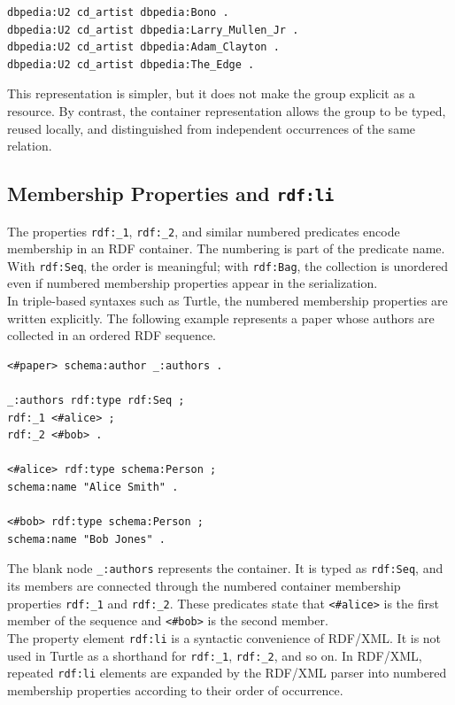\documentclass{scrbook}
\begin{document}
	\begin{lstlisting}
dbpedia:U2 cd_artist dbpedia:Bono .
dbpedia:U2 cd_artist dbpedia:Larry_Mullen_Jr .
dbpedia:U2 cd_artist dbpedia:Adam_Clayton .
dbpedia:U2 cd_artist dbpedia:The_Edge .
	\end{lstlisting}
	
	This representation is simpler, but it does not make the group explicit as a resource. By contrast, the container representation allows the group to be typed, reused locally, and distinguished from independent occurrences of the same relation.
	
	\subsection{Membership Properties and \texttt{rdf:li}}
	
	The properties \texttt{rdf:\_1}, \texttt{rdf:\_2}, and similar numbered predicates encode membership in an RDF container. The numbering is part of the predicate name. With \texttt{rdf:Seq}, the order is meaningful; with \texttt{rdf:Bag}, the collection is unordered even if numbered membership properties appear in the serialization.\\
	
	In triple-based syntaxes such as Turtle, the numbered membership properties are written explicitly. The following example represents a paper whose authors are collected in an ordered RDF sequence.
	
	\begin{lstlisting}
<#paper> schema:author _:authors .

_:authors rdf:type rdf:Seq ;
rdf:_1 <#alice> ;
rdf:_2 <#bob> .

<#alice> rdf:type schema:Person ;
schema:name "Alice Smith" .

<#bob> rdf:type schema:Person ;
schema:name "Bob Jones" .
	\end{lstlisting}
	
	The blank node \texttt{\_:authors} represents the container. It is typed as \texttt{rdf:Seq}, and its members are connected through the numbered container membership properties \texttt{rdf:\_1} and \texttt{rdf:\_2}. These predicates state that \texttt{<\#alice>} is the first member of the sequence and \texttt{<\#bob>} is the second member.\\
	
	The property element \texttt{rdf:li} is a syntactic convenience of RDF/XML. It is not used in Turtle as a shorthand for \texttt{rdf:\_1}, \texttt{rdf:\_2}, and so on. In RDF/XML, repeated \texttt{rdf:li} elements are expanded by the RDF/XML parser into numbered membership properties according to their order of occurrence.\\
	
\end{document}
